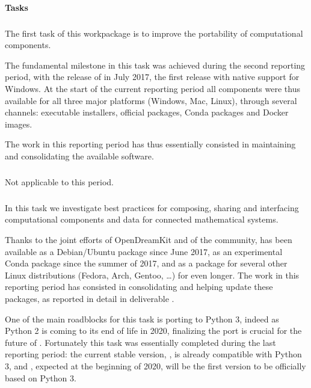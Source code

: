 \paragraph{Tasks}

  \subparagraph{}
  \label{component-architecture@portability}
  The first task of this workpackage is to improve the portability of
  computational components.

  The fundamental milestone in this task was achieved during the
  second reporting period, with the release of  in July 2017,
  the first release with native support for Windows. At the start of
  the current reporting period all \ODK components were thus available
  for all three major platforms (Windows, Mac, Linux), through several
  channels: executable installers, official packages, Conda packages
  and Docker images.

  The work in this reporting period has thus essentially consisted in
  maintaining and consolidating the available software.

  \subparagraph{}
  \label{component-architecture@interface-systems}
  Not applicable to this period.
  
  \subparagraph{}
  \label{component-architecture@mod-packaging}
  In this task we investigate best practices for composing, sharing
  and interfacing computational components and data for connected
  mathematical systems.

  Thanks to the joint efforts of OpenDreamKit and of the community,
  \Sage has been available as a Debian/Ubuntu package since June 2017,
  as an experimental Conda package since the summer of 2017, and as a
  package for several other Linux distributions (Fedora, Arch, Gentoo,
  \dots) for even longer. The work in this reporting period has
  consisted in consolidating and helping update these packages, as
  reported in detail in deliverable
  .

  One of the main roadblocks for this task is porting \Sage to Python
  3, indeed as Python 2 is coming to its end of life in 2020,
  finalizing the port is crucial for the future of \Sage. Fortunately
  this task was essentially completed during the last reporting
  period: the current stable version, , is already compatible
  with Python 3, and , expected at the beginning of 2020,
  will be the first \Sage version to be officially based on Python 3.

